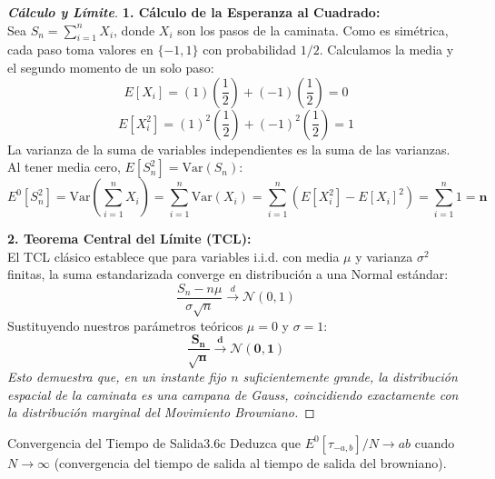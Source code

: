 \documentclass[10pt,a4paper]{article}
\begin{document}
\begin{proof}[\textbf{Cálculo y Límite}]
    \textbf{1. Cálculo de la Esperanza al Cuadrado:} \\
    Sea $S_n = \sum_{i=1}^n X_i$, donde $X_i$ son los pasos de la caminata. Como es simétrica, cada paso toma valores en $\{-1, 1\}$ con probabilidad $1/2$.
    Calculamos la media y el segundo momento de un solo paso:
    \[ E[X_i] = (1)\left(\frac{1}{2}\right) + (-1)\left(\frac{1}{2}\right) = 0 \]
    \[ E[X_i^2] = (1)^2\left(\frac{1}{2}\right) + (-1)^2\left(\frac{1}{2}\right) = 1 \]
    La varianza de la suma de variables independientes es la suma de las varianzas. Al tener media cero, $E[S_n^2] = \text{Var}(S_n)$:
    \[ E^0[S_n^2] = \text{Var}\left( \sum_{i=1}^n X_i \right) = \sum_{i=1}^n \text{Var}(X_i) = \sum_{i=1}^n (E[X_i^2] - E[X_i]^2) = \sum_{i=1}^n 1 = \mathbf{n} \]

    \textbf{2. Teorema Central del Límite (TCL):} \\
    El TCL clásico establece que para variables i.i.d. con media $\mu$ y varianza $\sigma^2$ finitas, la suma estandarizada converge en distribución a una Normal estándar:
    \[ \frac{S_n - n\mu}{\sigma \sqrt{n}} \xrightarrow{d} \mathcal{N}(0,1) \]
    Sustituyendo nuestros parámetros teóricos $\mu = 0$ y $\sigma = 1$:
    \[ \mathbf{\frac{S_n}{\sqrt{n}} \xrightarrow{d} \mathcal{N}(0,1)} \]
    \textit{Esto demuestra que, en un instante fijo $n$ suficientemente grande, la distribución espacial de la caminata es una campana de Gauss, coincidiendo exactamente con la distribución marginal del Movimiento Browniano.}
\end{proof}

\newpage

\begin{ejercicio}{Convergencia del Tiempo de Salida}{3.6c}
    Deduzca que $E^0[\tau_{-a,b}]/N \to a b$ cuando $N \to \infty$ (convergencia del tiempo de salida al tiempo de salida del browniano).
\end{ejercicio}
\end{document}
